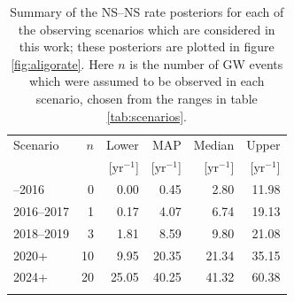 \documentclass[twocolumn]{aastex61}
\newcommand{\yr}{\mathrm{yr}}
\newcommand{\BNS}{\ac{NS}--\ac{NS}\xspace}
\begin{document}
\begin{table}
\begin{center}
  \begin{tabular}{lrrrrr}
    \toprule
    Scenario &    $n$ & Lower       & MAP             & Median          & Upper\\
             &        & [$\yr^{-1}$] & [$\yr^{-1}$]    & [$\yr^{-1}$]    & [$\yr^{-1}$]  \\
    \colrule
    2015--2016 & 0   & 0.00	 & 0.45	 & 2.80	 & 11.98	\\
    2016--2017 & 1   & 0.17	 & 4.07	 & 6.74	 & 19.13	\\
    2018--2019 & 3   & 1.81	 & 8.59	 & 9.80	 & 21.08	\\
    2020+      & 10  & 9.95  & 20.35 & 21.34 & 35.15	\\
    2024+      & 20  & 25.05 & 40.25 & 41.32 & 60.38	\\
    \botrule
\end{tabular}
\end{center}

\caption{Summary of the \BNS rate posteriors for each of the observing
  scenarios which are considered in this work; these posteriors are plotted
  in figure \ref{fig:aligorate}. Here $n$ is the number of \ac{GW} events which were assumed to be observed in each scenario, chosen from the ranges in table \ref{tab:scenarios}.
  \label{tab:rateposteriors}
}
\end{table}
\end{document}
